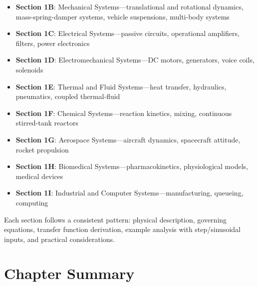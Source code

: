 \begin{itemize}
    \item \textbf{Section 1B}: Mechanical Systems---translational and rotational dynamics, mass-spring-damper systems, vehicle suspensions, multi-body systems

    \item \textbf{Section 1C}: Electrical Systems---passive circuits, operational amplifiers, filters, power electronics

    \item \textbf{Section 1D}: Electromechanical Systems---DC motors, generators, voice coils, solenoids

    \item \textbf{Section 1E}: Thermal and Fluid Systems---heat transfer, hydraulics, pneumatics, coupled thermal-fluid

    \item \textbf{Section 1F}: Chemical Systems---reaction kinetics, mixing, continuous stirred-tank reactors

    \item \textbf{Section 1G}: Aerospace Systems---aircraft dynamics, spacecraft attitude, rocket propulsion

    \item \textbf{Section 1H}: Biomedical Systems---pharmacokinetics, physiological models, medical devices

    \item \textbf{Section 1I}: Industrial and Computer Systems---manufacturing, queueing, computing
\end{itemize}

Each section follows a consistent pattern: physical description, governing equations, transfer function derivation, example analysis with step/sinusoidal inputs, and practical considerations.

\section{Chapter Summary}
\label{sec:chapter_summary}


